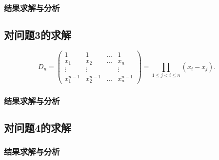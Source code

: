 \subsubsection{结果求解与分析}


\subsection{对问题3的求解}

\zhlipsum[3]

\begin{equation}\label{equ:VandermondeDet}
D_n = \begin{pmatrix}
1 & 1 & \ldots & 1 \\
x_1 & x_2 & \ldots & x_n \\
\vdots & \vdots & & \vdots \\
x_1^{n-1} & x_2^{n-1} & \ldots & x_n^{n-1}
\end{pmatrix} = \prod_{1\leq j<i\leq n}{(x_i-x_j)}.
\end{equation}

\zhlipsum[4]

\subsubsection{结果求解与分析}


\subsection{对问题4的求解}

\subsubsection{结果求解与分析}



